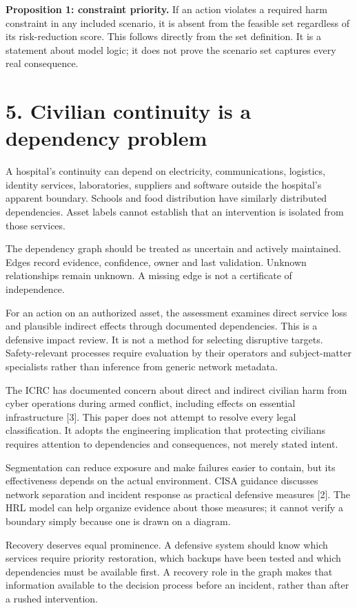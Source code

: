 \documentclass[11pt]{article}
\begin{document}
\textbf{Proposition 1: constraint priority.} If an action violates a required harm constraint in any included scenario, it is absent from the feasible set regardless of its risk-reduction score. This follows directly from the set definition. It is a statement about model logic; it does not prove the scenario set captures every real consequence.

\clearpage
\section*{5. Civilian continuity is a dependency problem}
A hospital's continuity can depend on electricity, communications, logistics, identity services, laboratories, suppliers and software outside the hospital's apparent boundary. Schools and food distribution have similarly distributed dependencies. Asset labels cannot establish that an intervention is isolated from those services.

The dependency graph should be treated as uncertain and actively maintained. Edges record evidence, confidence, owner and last validation. Unknown relationships remain unknown. A missing edge is not a certificate of independence.

For an action on an authorized asset, the assessment examines direct service loss and plausible indirect effects through documented dependencies. This is a defensive impact review. It is not a method for selecting disruptive targets. Safety-relevant processes require evaluation by their operators and subject-matter specialists rather than inference from generic network metadata.

The ICRC has documented concern about direct and indirect civilian harm from cyber operations during armed conflict, including effects on essential infrastructure [3]. This paper does not attempt to resolve every legal classification. It adopts the engineering implication that protecting civilians requires attention to dependencies and consequences, not merely stated intent.

Segmentation can reduce exposure and make failures easier to contain, but its effectiveness depends on the actual environment. CISA guidance discusses network separation and incident response as practical defensive measures [2]. The HRL model can help organize evidence about those measures; it cannot verify a boundary simply because one is drawn on a diagram.

Recovery deserves equal prominence. A defensive system should know which services require priority restoration, which backups have been tested and which dependencies must be available first. A recovery role in the graph makes that information available to the decision process before an incident, rather than after a rushed intervention.
\end{document}
